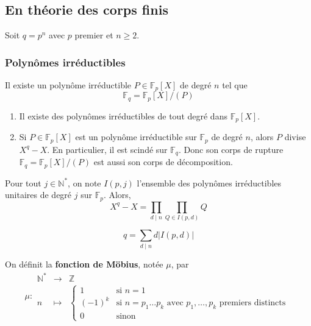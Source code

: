   \subsection{En théorie des corps finis}

  Soit $q = p^n$ avec $p$ premier et $n \geq 2$.

  \subsubsection{Polynômes irréductibles}


  \begin{theorem}
    Il existe un polynôme irréductible $P \in \mathbb{F}_p[X]$ de degré $n$ tel que
    \[ \mathbb{F}_q = \mathbb{F}_p[X] / (P) \]
  \end{theorem}

  \begin{corollary}
    \begin{enumerate}[label={\bfseries(\roman*)}]
      \item Il existe des polynômes irréductibles de tout degré dans $\mathbb{F}_p[X]$.
      \item Si $P \in \mathbb{F}_p[X]$ est un polynôme irréductible sur $\mathbb{F}_p$ de degré $n$, alors $P$ divise $X^q - X$. En particulier, il est scindé sur $\mathbb{F}_q$. Donc son corps de rupture $\mathbb{F}_q = \mathbb{F}_p[X] / (P)$ est aussi son corps de décomposition.
    \end{enumerate}
  \end{corollary}

  \begin{theorem}
    Pour tout $j \in \mathbb{N}^*$, on note $I(p,j)$ l'ensemble des polynômes irréductibles unitaires de degré $j$ sur $\mathbb{F}_p$. Alors,
    \[ X^q - X = \prod_{d \mid n} \prod_{Q \in I(p,d)} Q \]
  \end{theorem}

  \begin{corollary}
    \[ q = \sum_{d \mid n} d \vert I(p,d) \vert \]
  \end{corollary}

  \begin{definition}
    On définit la \textbf{fonction de Möbius}, notée $\mu$, par
    \[
    \mu :
    \begin{array}{ccc}
      \mathbb{N}^* &\rightarrow& \mathbb{Z} \\
      n &\mapsto& \begin{cases}
        1 &\text{si } n = 1 \\
        (-1)^k &\text{si } n = p_1 \dots p_k \text{ avec } p_1, \dots, p_k \text{ premiers distincts} \\
        0 &\text{sinon}
      \end{cases}
    \end{array}
    \]
  \end{definition}

